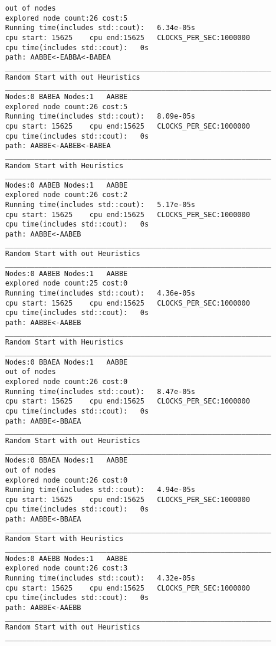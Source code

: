 \documentclass[12pt]{article}
\begin{document}
\begin{lstlisting}
	out of nodes
	explored node count:26 cost:5
	Running time(includes std::cout):	6.34e-05s
	cpu start: 15625	cpu end:15625	CLOCKS_PER_SEC:1000000
	cpu time(includes std::cout):	0s
	path: AABBE<-EABBA<-BABEA
	_______________________________________________________________
	Random Start with out Heuristics
	_______________________________________________________________
	Nodes:0	BABEA Nodes:1	AABBE
	explored node count:26 cost:5
	Running time(includes std::cout):	8.09e-05s
	cpu start: 15625	cpu end:15625	CLOCKS_PER_SEC:1000000
	cpu time(includes std::cout):	0s
	path: AABBE<-AABEB<-BABEA
	_______________________________________________________________
	Random Start with Heuristics
	_______________________________________________________________
	Nodes:0	AABEB Nodes:1	AABBE
	explored node count:26 cost:2
	Running time(includes std::cout):	5.17e-05s
	cpu start: 15625	cpu end:15625	CLOCKS_PER_SEC:1000000
	cpu time(includes std::cout):	0s
	path: AABBE<-AABEB
	_______________________________________________________________
	Random Start with out Heuristics
	_______________________________________________________________
	Nodes:0	AABEB Nodes:1	AABBE
	explored node count:25 cost:0
	Running time(includes std::cout):	4.36e-05s
	cpu start: 15625	cpu end:15625	CLOCKS_PER_SEC:1000000
	cpu time(includes std::cout):	0s
	path: AABBE<-AABEB
	_______________________________________________________________
	Random Start with Heuristics
	_______________________________________________________________
	Nodes:0	BBAEA Nodes:1	AABBE
	out of nodes
	explored node count:26 cost:0
	Running time(includes std::cout):	8.47e-05s
	cpu start: 15625	cpu end:15625	CLOCKS_PER_SEC:1000000
	cpu time(includes std::cout):	0s
	path: AABBE<-BBAEA
	_______________________________________________________________
	Random Start with out Heuristics
	_______________________________________________________________
	Nodes:0	BBAEA Nodes:1	AABBE
	out of nodes
	explored node count:26 cost:0
	Running time(includes std::cout):	4.94e-05s
	cpu start: 15625	cpu end:15625	CLOCKS_PER_SEC:1000000
	cpu time(includes std::cout):	0s
	path: AABBE<-BBAEA
	_______________________________________________________________
	Random Start with Heuristics
	_______________________________________________________________
	Nodes:0	AAEBB Nodes:1	AABBE
	explored node count:26 cost:3
	Running time(includes std::cout):	4.32e-05s
	cpu start: 15625	cpu end:15625	CLOCKS_PER_SEC:1000000
	cpu time(includes std::cout):	0s
	path: AABBE<-AAEBB
	_______________________________________________________________
	Random Start with out Heuristics
	_______________________________________________________________

\end{lstlisting}
\end{document}

